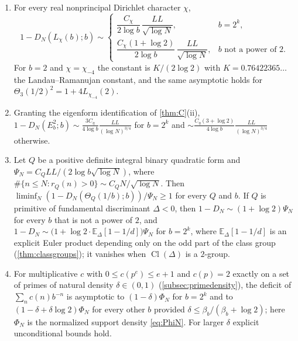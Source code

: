\documentclass[11pt]{article}
\DeclareMathOperator{\Cl}{Cl}
\newcommand{\cnt}{\#}
\begin{document}
\begin{maintheorem}\label{thm:D}
\leavevmode
\begin{enumerate}[label=\textup{(\roman*)},nosep]
\item For every real nonprincipal Dirichlet character $\chi$,
\[
1-D_N(L_\chi(b);b)\sim
\begin{cases}
\dfrac{C_\chi}{2\log b}\,\dfrac{LL}{\sqrt{\log N}}, & b=2^k,\\[2ex]
\dfrac{C_\chi(1+\log2)}{2\log b}\,\dfrac{LL}{\sqrt{\log N}}, & b\text{ not a power of }2.
\end{cases}
\]
For $b=2$ and $\chi=\chi_{-4}$ the constant is $K/(2\log2)$ with $K=0.76422365\ldots$
the Landau--Ramanujan constant, and the same asymptotic holds for
$\Theta_3(1/2)^2=1+4L_{\chi_{-4}}(2)$.
\item Granting the eigenform identification of \cref{thm:C}(ii),
$1-D_N(E_b^2;b)\sim\frac{3C_\eta}{4\log b}\frac{LL}{(\log N)^{3/4}}$ for $b=2^k$ and
$\sim\frac{C_\eta(3+\log2)}{4\log b}\frac{LL}{(\log N)^{3/4}}$ otherwise.
\item Let $Q$ be a positive definite integral binary quadratic form and
$\Psi_N=C_QLL/(2\log b\sqrt{\log N})$, where
$\cnt\{n\le N:r_Q(n)>0\}\sim C_QN/\sqrt{\log N}$. Then
$\liminf_N(1-D_N(\Theta_Q(1/b);b))/\Psi_N\ge1$ for every $Q$ and $b$. If $Q$ is
primitive of fundamental discriminant $\Delta<0$, then
$1-D_N\sim(1+\log2)\Psi_N$ for every $b$ that is not a power of $2$, and
$1-D_N\sim\bigl(1+\log2\cdot\mathbb E_\Delta[1-1/d]\bigr)\Psi_N$ for $b=2^k$, where
$\mathbb E_\Delta[1-1/d]$ is an explicit Euler product depending only on the odd part
of the class group (\cref{thm:classgroups}); it vanishes when $\Cl(\Delta)$ is a
$2$-group.
\item For multiplicative $c$ with $0\le c(p^e)\le e+1$ and $c(p)=2$ exactly on a set
of primes of natural density $\delta\in(0,1)$ (\cref{subsec:primedensity}), the
deficit of $\sum_nc(n)b^{-n}$ is asymptotic to $(1-\delta)\Phi_N$ for $b=2^k$ and
to $(1-\delta+\delta\log2)\Phi_N$ for every other $b$ provided
$\delta\le\beta_b/(\beta_b+\log2)$; here $\Phi_N$ is the normalized support density
\eqref{eq:PhiN}. For larger $\delta$ explicit unconditional bounds hold.
\end{enumerate}
\end{maintheorem}
\end{document}
